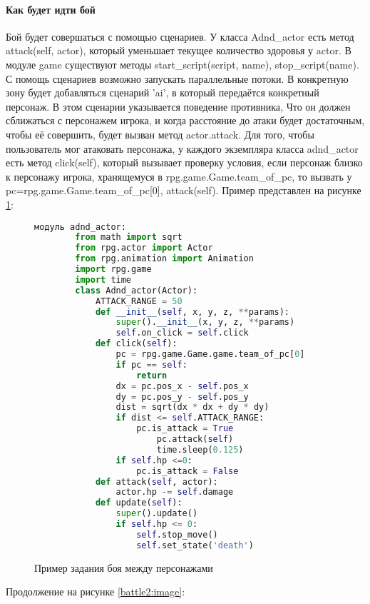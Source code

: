 \paragraph{Как будет идти бой}
Бой будет совершаться с помощью сценариев. У класса Adnd\_actor есть метод attack(self, actor), который уменьшает текущее количество здоровья у actor. В модуле game существуют методы start\_script(script, name), stop\_script(name). С помощь сценариев возможно запускать параллельные потоки. В конкретную зону будет добавляться сценарий 'ai', в который передаётся конкретный персонаж. В этом сценарии указывается поведение противника, Что он должен сближаться с персонажем игрока, и когда расстояние до атаки будет достаточным, чтобы её совершить, будет вызван метод actor.attack. Для того, чтобы пользователь мог атаковать персонажа, у каждого экземпляра класса adnd\_actor есть метод click(self), который вызывает проверку условия, если персонаж близко к персонажу игрока, хранящемуся в rpg.game.Game.team\_of\_pc, то вызвать у pc=rpg.game.Game.team\_of\_pc[0], attack(self).
Пример представлен на рисунке \ref{battle:image}:
\begin{figure}[H]
	\begin{lstlisting}[language=Python]
		модуль adnd_actor:
		from math import sqrt
		from rpg.actor import Actor
		from rpg.animation import Animation
		import rpg.game
		import time
		class Adnd_actor(Actor):	
			ATTACK_RANGE = 50
			def __init__(self, x, y, z, **params):
				super().__init__(x, y, z, **params)
				self.on_click = self.click
			def click(self):
				pc = rpg.game.Game.game.team_of_pc[0]
				if pc == self:
					return
				dx = pc.pos_x - self.pos_x
				dy = pc.pos_y - self.pos_y
				dist = sqrt(dx * dx + dy * dy)
				if dist <= self.ATTACK_RANGE:
					pc.is_attack = True
						pc.attack(self)
						time.sleep(0.125)
				if self.hp <=0:
					pc.is_attack = False
			def attack(self, actor):
				actor.hp -= self.damage
			def update(self):
				super().update()
				if self.hp <= 0:
					self.stop_move()
					self.set_state('death')
\end{lstlisting}  
\caption{Пример задания боя между персонажами}
\label{battle:image}
\end{figure}
Продолжение на рисунке \ref{battle2:image}:
